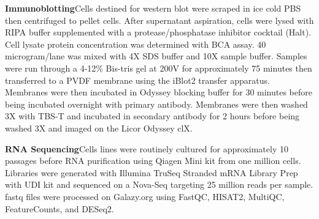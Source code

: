 \textbf{Immunoblotting}Cells destined for western blot were scraped in ice cold PBS then centrifuged to pellet cells. After supernatant aspiration, cells were lysed with RIPA buffer supplemented with a protease/phosphatase inhibitor cocktail (Halt). Cell lysate protein concentration was determined with BCA assay. 40 microgram/lane was mixed with 4X SDS buffer and 10X sample buffer. Samples were run through a 4-12\% Bis-tris gel at 200V for approximately 75 minutes then transferred to a PVDF membrane using the iBlot2 transfer apparatus. Membranes were then incubated in Odyssey blocking buffer for 30 minutes before being incubated overnight with primary antibody. Membranes were then washed 3X with TBS-T and incubated in secondary antibody for 2 hours before being washed 3X and imaged on the Licor Odyssey clX.

\textbf{RNA Sequencing}Cells lines were routinely cultured for approximately 10 passages before RNA purification using Qiagen Mini kit from one million cells. Libraries were generated with Illumina TruSeq Stranded mRNA Library Prep with UDI kit and sequenced on a Nova-Seq targeting 25 million reads per sample. fastq files were processed on Galazy.org using FastQC, HISAT2, MultiQC, FeatureCounts, and DESeq2.

